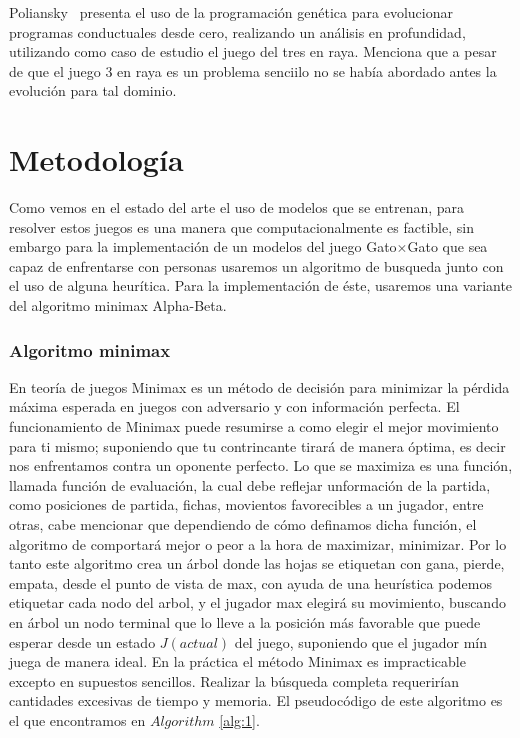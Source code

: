 \documentclass[runningheads]{llncs}
\begin{document}
Poliansky~\cite{ref_article1} presenta el uso de la programación genética para evolucionar programas conductuales desde cero, realizando un análisis en profundidad, utilizando como caso de estudio el juego del tres en raya. Menciona que a pesar de que el juego 3 en raya es un problema senciilo no se había abordado antes la evolución para tal dominio. 


\section{Metodología}
Como vemos en el estado del arte el uso de modelos que se entrenan, para resolver estos juegos es una manera que computacionalmente es factible, sin embargo para la implementación de un modelos del juego Gato$\times$Gato que sea capaz de enfrentarse con personas usaremos un algoritmo de busqueda junto con el uso de alguna heurítica. Para la implementación de éste, usaremos una variante del algoritmo minimax Alpha-Beta. 
\subsubsection{Algoritmo minimax}
En teoría de juegos Minimax es un método de decisión para minimizar la pérdida máxima esperada en juegos con adversario y con información perfecta. El funcionamiento de Minimax puede resumirse a como elegir el mejor movimiento para ti mismo; suponiendo que tu contrincante tirará de manera óptima, es decir nos enfrentamos contra un oponente perfecto. Lo que se maximiza es una función, llamada función de evaluación, la cual debe reflejar unformación de la partida, como posiciones de partida, fichas, movientos favorecibles a un jugador, entre otras, cabe mencionar que dependiendo de cómo definamos dicha función, el algoritmo de comportará mejor o peor a la hora de maximizar, minimizar. Por lo tanto este algoritmo crea un árbol donde las hojas se etiquetan con gana, pierde, empata, desde el punto de vista de max, con ayuda de una heurística podemos etiquetar cada nodo del arbol, y el jugador max elegirá su movimiento, buscando en árbol un nodo terminal que lo lleve a la posición más favorable que puede esperar desde un estado $J(actual)$ del juego,  suponiendo que el jugador mín juega de manera ideal.
En la práctica el método Minimax es impracticable excepto en supuestos sencillos. Realizar la búsqueda completa requerirían cantidades excesivas de tiempo y memoria. El pseudocódigo de este algoritmo es el que encontramos en $Algorithm$ \ref{alg:1}.
\end{document}
